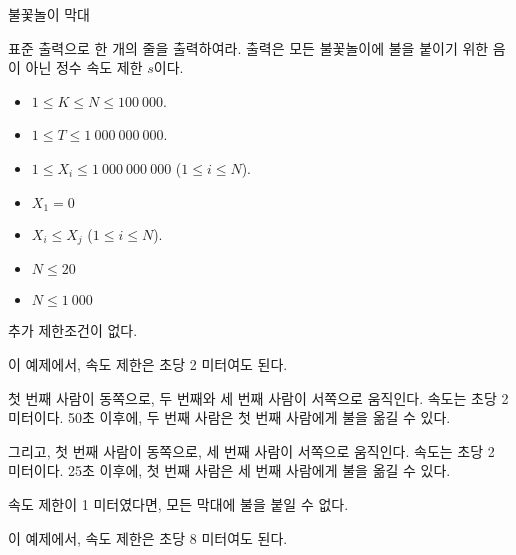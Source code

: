 \begin{problem}{불꽃놀이 막대}
	
	\OutputFile
	
	표준 출력으로 한 개의 줄을 출력하여라. 출력은 모든 불꽃놀이에 불을 붙이기 위한 음이 아닌 정수 속도 제한 $s$이다.
	
	\Constraints
	
	\begin{itemize}
		
		\item $1 \le K \le N \le 100\ 000$.
		\item $1 \le T \le 1\ 000\ 000\ 000$.
		\item $1 \le X_i \le 1\ 000\ 000\ 000$ ($1 \le i \le N$).
		\item $X_1 = 0$
		\item $X_i \le X_j$ ($1 \le i \le N$).	
	\end{itemize}
	
	
	\begin{itemize}
		\item $N \le 20$
	\end{itemize}
	
	\begin{itemize}
		\item $N \le 1\ 000$
	\end{itemize}
	
	
	추가 제한조건이 없다.
	
	\Examples
	
	\begin{example}
	\end{example}
	
	이 예제에서, 속도 제한은 초당 2 미터여도 된다.
	
	첫 번째 사람이 동쪽으로, 두 번째와 세 번째 사람이 서쪽으로 움직인다. 속도는 초당 2 미터이다. 50초 이후에, 두 번째 사람은 첫 번째 사람에게 불을 옮길 수 있다.
	
	그리고, 첫 번째 사람이 동쪽으로, 세 번째 사람이 서쪽으로 움직인다. 속도는 초당 2 미터이다. 25초 이후에, 첫 번째 사람은 세 번째 사람에게 불을 옮길 수 있다.
	
	속도 제한이 1 미터였다면, 모든 막대에 불을 붙일 수 없다.

	\begin{example}
	\exmp{
		3 2 10
		0
		200 
		300
	}{%
		8
	}%
	\end{example}
	
	이 예제에서, 속도 제한은 초당 8 미터여도 된다.
		

\end{problem}
